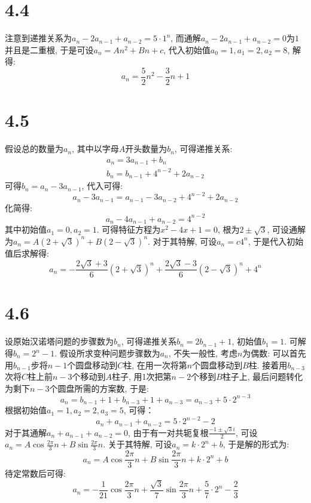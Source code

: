 \documentclass[UTF8,oneside]{article}
\begin{document}
\section{4.4}

注意到递推关系为$a_n - 2a_{n-1} + a_{n-2} = 5\cdot 1^n$, 而通解$a_n - 2a_{n-1} + a_{n-2} = 0$为$1$并且是二重根, 于是可设$a_n = An^2 + Bn+c$, 代入初始值$a_0 =1, a_1=2, a_2 = 8$, 解得:
\[
    a_n = \frac{5}{2}n^2 -\frac{3}{2}n + 1
\]

\section{4.5}

假设总的数量为$a_n$, 其中以字母$A$开头数量为$b_n$, 可得递推关系:
\begin{align*}
    a_n = 3a_{n-1} + b_n \\
    b_n = b_{n-1} + 4^{n-2} + 2a_{n-2}
\end{align*}
可得$b_n = a_n - 3a_{n-1}$, 代入可得:
\[
    a_n - 3a_{n-1} = a_{n-1} - 3a_{n-2} + 4^{n-2} + 2a_{n-2}
\]
化简得:
\[
    a_n - 4a_{n-1} +a_{n-2} = 4^{n-2}
\]
其中初始值$a_1=0,a_2=1$. 可得特征方程为$x^2 - 4x + 1=0$, 根为$2\pm \sqrt{3}$, 可设通解为$a_n = A(2+\sqrt{3})^n + B(2-\sqrt{3})^n$. 对于其特解, 可设$a_n = c4^n$, 于是代入初始值后求解得:
\[
    a_n = - \frac{2\sqrt{3}+3}{6}(2+\sqrt{3})^n + \frac{2\sqrt{3}-3}{6}(2-\sqrt{3})^n + 4^n
\]

\section{4.6}

设原始汉诺塔问题的步骤数为$b_n$, 可得递推关系$b_n = 2b_{n-1} + 1$, 初始值$b_1=1$. 可解得$b_n = 2^n - 1$. 假设所求变种问题步骤数为$a_n$, 不失一般性, 考虑$n$为偶数: 可以首先用$b_{n-1}$步将$n-1$个圆盘移动到$C$柱, 在用一次将第$n$个圆盘移动到$B$柱. 接着用$b_{n-3}$次将$C$柱上前$n-3$个移动到$A$柱子, 用1次把第$n-2$个移到$B$柱子上, 最后问题转化为剩下$n-3$个圆盘所需的方案数, 于是:
\[
    a_n = b_{n-1} + 1 + b_{n-3} + 1 + a_{n-3} = a_{n-3} + 5\cdot 2^{n-3}
\]
根据初始值$a_1 = 1, a_2 = 2, a_3 = 5$, 可得：
\[
    a_{n} + a_{n-1} + a_{n-2} = 5\cdot 2^{n-2} - 2
\]
对于其通解$a_{n} + a_{n-1} + a_{n-2}=0$, 由于有一对共轭复根$\frac{-1\pm \sqrt{3}i}{2}$, 可设$a_n = A\cos \frac{2\pi}{3}n + B\sin \frac{2\pi}{3}n$. 关于其特解, 可设$a_n = k\cdot 2^n + b$, 于是解的形式为:
\[
    a_n = A\cos \frac{2\pi}{3}n + B\sin \frac{2\pi}{3}n + k\cdot 2^n + b
\]
待定常数后可得:
\[
    a_n = -\frac{1}{21}\cos \frac{2\pi}{3}n + \frac{\sqrt{3}}{7}\sin \frac{2\pi}{3}n + \frac{5}{7} \cdot 2^n - \frac{2}{3}
\]
\end{document}
